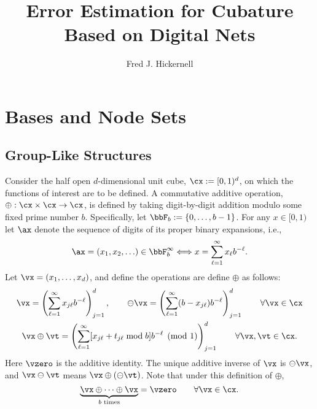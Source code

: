 \documentclass[]{elsarticle}
\theoremstyle{definition}
\begin{document}
\begin{frontmatter}

\title{Error Estimation for Cubature Based on Digital Nets}
\author{Fred J. Hickernell}
\address{Room E1-208, Department of Applied Mathematics, Illinois Institute of Technology,\\ 10 W.\ 32$^{\text{nd}}$ St., Chicago, IL 60616}
\begin{abstract} 
\end{abstract}

\begin{keyword}


\end{keyword}
\end{frontmatter}

\section{Bases and Node Sets}

\subsection{Group-Like Structures}
Consider the half open $d$-dimensional unit cube, $\cx:=[0,1)^d$, on which the functions of interest are to be defined. A commutative additive operation, $\oplus:\cx \times \cx \to \cx$, is defined by taking digit-by-digit addition modulo some fixed prime number $b$.  Specifically, let $\bbF_b:=\{0, \ldots, b-1\}$.  For any $x \in [0,1)$ let $\ax$ denote the sequence of digits of its proper binary expansions, i.e., 
\begin{equation*}
\ax=(x_1, x_2, \ldots ) \in \bbF_b^\infty \Longleftrightarrow x=\sum_{\ell=1}^\infty x_{\ell} b^{-\ell}.
\end{equation*}
Let $\vx=(x_1, \ldots, x_d)$, and define the operations are define $\oplus$ as follows:
\begin{gather*}
\vx = \left(\sum_{\ell=1}^{\infty} x_{j\ell} b^{-\ell}\right)_{j=1}^d, \qquad \ominus \vx = \left(\sum_{\ell=1}^{\infty} (b-x_{j\ell}) b^{-\ell}\right)_{j=1}^d \qquad \forall \vx \in \cx  \\ 
\vx \oplus \vt = \left(\sum_{\ell=1}^{\infty} [x_{j\ell} + t_{j\ell} \bmod b] b^{-\ell} \pmod{1} \right)_{j=1}^d \qquad \forall \vx, \vt \in \cx.
\end{gather*}
Here $\vzero$ is the additive identity.  The unique additive inverse of $\vx$ is $\ominus \vx$, and $\vx \ominus \vt$ means $\vx \oplus (\ominus \vt)$.  Note that under this definition of $\oplus$,
\[
\underbrace{\vx \oplus \cdots \oplus \vx}_{b \text{ times}} = \vzero \qquad \forall \vx \in \cx.
\]
\end{document}
